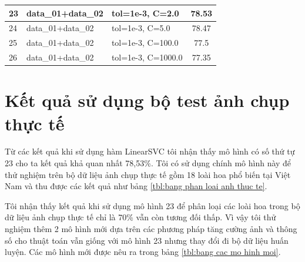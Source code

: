 \documentclass[12pt]{report}
\begin{document}
\begin{table}
\begin{tabular}{|l|l|l|c|}
			23  & data\_01+data\_02                                               & tol=1e-3, C=2.0                                                             & 78.53                                                                 \\ \hline
			24  & data\_01+data\_02                                               & tol=1e-3, C=5.0                                                             & 78.47                                                                 \\ \hline
			25  & data\_01+data\_02                                               & tol=1e-3, C=100.0                                                           & 77.5                                                                  \\ \hline
			26  & data\_01+data\_02                                               & tol=1e-3, C=1000.0                                                          & 77.35                                                                 \\ \hline
			\end{tabular}
		\end{table}
		

		
		\section{Kết quả sử dụng bộ test ảnh chụp thực tế}
		Từ các kết quả khi sử dụng hàm LinearSVC tôi nhận thấy mô hình có số thứ tự  23 cho ta kết quả khả quan nhất 78,53\%. Tôi có sử dụng chính mô hình này để thử nghiệm trên bộ dữ liệu ảnh chụp thực tế gồm 18 loài hoa phổ biến tại Việt Nam và thu được các kết quả như bảng \ref{tbl:bang phan loai anh thuc te}. 
		
		Tôi nhận thấy kết quả khi sử dụng mô hình 23 để phân loại các loài hoa trong bộ dữ liệu ảnh chụp thực tế chỉ là 70\% vẫn còn tương đối thấp. Vì vậy tôi thử nghiệm thêm 2 mô hình mới dựa trên các phương pháp tăng cường ảnh và thông số cho thuật toán vẫn giống với mô hình 23 nhưng thay đổi đi bộ dữ liệu huấn luyện. Các mô hình mới được nêu ra trong bảng \ref{tbl:bang cac mo hinh moi}. 
		
\end{document}
